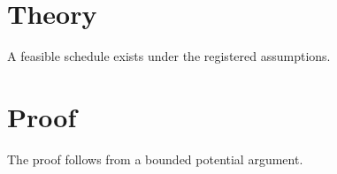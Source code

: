 \documentclass{article}
\begin{document}
\section{Theory}
\begin{theorem}\label{thm:budget-stability}A feasible schedule exists under the registered assumptions.\end{theorem}
\appendix
\section{Proof}\label{app:budget-proof}
The proof follows from a bounded potential argument.
\end{document}
